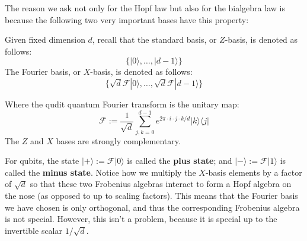 The reason we ask not only for the Hopf law but also for the bialgebra law is  because the following two very important bases have this property:
\begin{example}
Given fixed dimension $d$, recall that the standard basis, or $Z$-basis,  is denoted as follows:
$$\{ |0\rangle, \ldots, |d-1\rangle \}$$
The Fourier basis, or $X$-basis, is denoted as follows:
$$\{\sqrt{d} \mathcal{F}|0\rangle, \ldots, \sqrt{d}\mathcal{F}|d-1\rangle \}$$

Where the qudit quantum Fourier transform is the unitary map:
$$\mathcal{F} := \dfrac{1}{\sqrt{d}} \sum_{j,k=0}^{d-1} e^{2\pi\cdot i \cdot j \cdot k/d} | k\rangle \langle j | $$
The $Z$ and $X$ bases are strongly complementary.
\end{example}
For qubits, the  state $|+\rangle:=\mathcal{F}|0\rangle$ is called the {\bf plus state}; and  $|-\rangle:=\mathcal{F}|1\rangle$ is called the {\bf minus state}.
Notice how we multiply the $X$-basis elements by a factor of $\sqrt d$ so that these two Frobenius algebras interact to form a Hopf algebra on the nose (as opposed to up to scaling factors).  This means that the Fourier basis we have chosen is only orthogonal, and thus the corresponding Frobenius algebra is not special.  However, this isn't a problem, because it is special up to the invertible  scalar $1/\sqrt{d}$.

